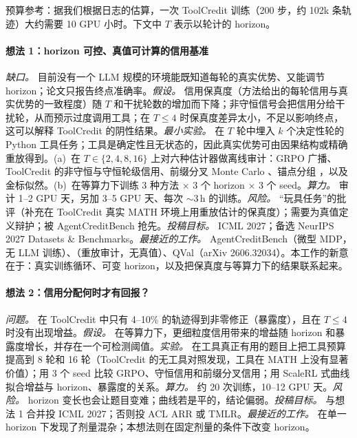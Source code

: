 预算参考：据我们根据日志的估算，一次 ToolCredit 训练（200 步，约 102k 条轨迹）大约需要 10 GPU 小时。下文中 $T$ 表示以轮计的 horizon。

\paragraph{想法 1：horizon 可控、真值可计算的信用基准}
\emph{缺口。} 目前没有一个 LLM 规模的环境能既知道每轮的真实优势、又能调节 horizon；论文只报告终点准确率。\emph{假设。} 信用保真度（方法给出的每轮信用与真实优势的一致程度）随 $T$ 和干扰轮数的增加而下降；非守恒信号会把信用分给干扰轮，从而预示过度调用工具；在 $T\leq4$ 时保真度差异太小，不足以影响终点，这可以解释 ToolCredit 的阴性结果。\emph{最小实验。} 在 $T$ 轮中埋入 $k$ 个决定性轮的 Python 工具任务；工具是确定性且无状态的，因此真实优势可由因果结构或精确重放得到。(a)~在 $T\in\{2,4,8,16\}$ 上对六种估计器做离线审计：GRPO 广播、ToolCredit 的非守恒与守恒轮级信用、前缀分叉 Monte Carlo \citep{kazemnejad2024vineppo,ji2025tree}、锚点分组 \citep{feng2025group}，以及金标似然。(b)~在等算力下训练 3 种方法 $\times$ 3 个 horizon $\times$ 3 个 seed。\emph{算力。} 审计 1--2 GPU 天，另加 3--5 GPU 天、每次 $\sim$3\,h 的训练。\emph{风险。} “玩具任务”的批评（补充在 ToolCredit 真实 MATH 环境上用重放估计的保真度）；需要为真值定义辩护；被 AgentCreditBench 抢先。\emph{投稿目标。} ICML 2027；备选 NeurIPS 2027 Datasets \& Benchmarks。\emph{最接近的工作。} AgentCreditBench（微型 MDP，无 LLM 训练\unverified）、\citet{zhang2026credit}（重放审计，无真值）、QVal（arXiv 2606.32034）\unverified。本工作的新意在于：真实训练循环、可变 horizon，以及把保真度与等算力下的结果联系起来。

\paragraph{想法 2：信用分配何时才有回报？}
\emph{问题。} 在 ToolCredit 中只有 4--10\% 的轨迹得到非零修正（暴露度），且在 $T\leq4$ 时没有出现增益。\emph{假设。} 在等算力下，更细粒度信用带来的增益随 horizon 和暴露度增长，并存在一个可检测阈值。\emph{实验。} 在工具真正有用的题目上把工具预算提高到 8 轮和 16 轮（ToolCredit 的无工具对照发现，工具在 MATH 上没有显著价值）；用 3 个 seed 比较 GRPO、守恒信用和前缀分叉信用；用 ScaleRL 式曲线 \citep{khatri2025art} 拟合增益与 horizon、暴露度的关系。\emph{算力。} 约 20 次训练，10--12 GPU 天。\emph{风险。} horizon 变长也会让题目变难；曲线若是平的，结论偏弱。\emph{投稿目标。} 与想法 1 合并投 ICML 2027；否则投 ACL ARR 或 TMLR。\emph{最接近的工作。} \citet{zhang2026credit} 在单一 horizon 下发现了剂量混杂；本想法则在固定剂量的条件下改变 horizon。


